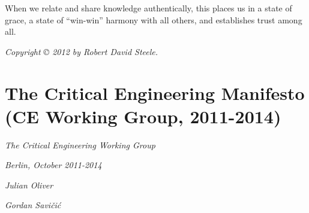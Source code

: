 \documentclass[letterpaper,12pt,english]{sphinxmanual}
\begin{document}
When we relate and share knowledge authentically, this places us in a state of grace, a state of ``win-win'' harmony with all others, and establishes trust among all.

\emph{Copyright © 2012 by Robert David Steele.}


\chapter{The Critical Engineering Manifesto (CE Working Group, 2011-2014)}
\label{2014::doc}\label{2014:the-critical-engineering-manifesto-ce-working-group-2011-2014}
\emph{The Critical Engineering Working Group}

\emph{Berlin, October 2011-2014}

\emph{Julian Oliver}

\emph{Gordan Savičić}
\end{document}
